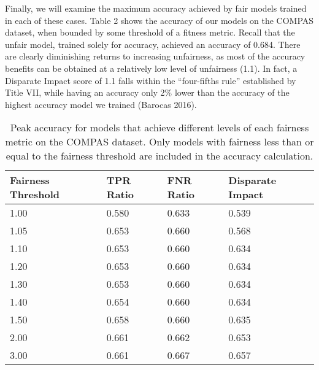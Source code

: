 \documentclass[twoside]{article}
\begin{document}

Finally, we will examine the maximum accuracy achieved by fair models trained in each of these cases. Table 2 shows the accuracy of our models on the COMPAS dataset, when bounded by some threshold of a fitness metric. Recall that the unfair model, trained solely for accuracy, achieved an accuracy of 0.684. There are clearly diminishing returns to increasing unfairness, as most of the accuracy benefits can be obtained at a relatively low level of unfairness (1.1). In fact, a Disparate Impact score of 1.1 falls within the “four-fifths rule” established by Title VII, while having an accuracy only 2\% lower than the accuracy of the highest accuracy model we trained (Barocas 2016).

\renewcommand{\arraystretch}{1.5}
\begin{table}
	\begin{center}
	\begin{tabular}{| l | l | l | l |}
	\hline
	Fairness Threshold & TPR Ratio & FNR Ratio & Disparate Impact \\ \hline
	1.00    & 0.580 & 0.633 & 0.539 \\ \hline
	1.05 & 0.653 & 0.660 & 0.568 \\ \hline
	1.10  & 0.653 & 0.660 & 0.634 \\ \hline
	1.20  & 0.653 & 0.660 & 0.634 \\ \hline
	1.30  & 0.653 & 0.660 & 0.634 \\ \hline
	1.40  & 0.654 & 0.660 & 0.634 \\ \hline
	1.50  & 0.658 & 0.660 & 0.635 \\ \hline
	2.00   & 0.661 & 0.662 & 0.653 \\ \hline
	3.00    & 0.661 & 0.667 & 0.657 \\ \hline
	\end{tabular}
	\end{center}
\caption{Peak accuracy for models that achieve different levels of each fairness metric on the COMPAS dataset. Only models with fairness less than or equal to the fairness threshold are included in the accuracy calculation.}
\label{table:name}
\end{table}
\end{document}
